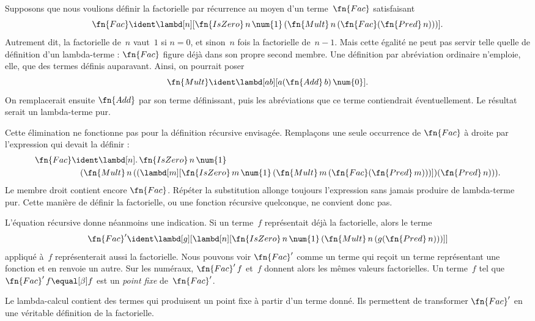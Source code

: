 \documentclass[../../../include/open-logic-section]{subfiles}
\begin{document}


Supposons que nous voulions définir la
factorielle par récurrence au moyen d'un
terme~$\fn{Fac}$ satisfaisant
\[
  \fn{Fac} \ident
  \lambd[n][\fn{IsZero}\,n\,\num{1}\,
    (\fn{Mult}\,n\,(
      \fn{Fac}(\fn{Pred}\,n)))].
\]
Autrement dit, la factorielle de~$n$
vaut~$1$ si $n=0$, et sinon~$n$ fois
la factorielle de~$n-1$. Mais cette
égalité ne peut pas servir telle quelle
de définition d'un lambda-terme :
$\fn{Fac}$ figure déjà dans son propre
second membre. Une définition par
abréviation ordinaire n'emploie, elle,
que des termes définis auparavant.
Ainsi, on pourrait poser
\[
  \fn{Mult} \ident
  \lambd[ab][a(\fn{Add}\,b)\,\num{0}].
\]
On remplacerait ensuite $\fn{Add}$
par son terme définissant, puis les
abréviations que ce terme contiendrait
éventuellement. Le résultat serait
un lambda-terme pur.

Cette élimination ne fonctionne pas
pour la définition récursive envisagée.
Remplaçons une seule occurrence de
$\fn{Fac}$ à droite par l'expression
qui devait la définir :
\begin{align*}
  \fn{Fac} &\ident
    \lambd[n].\,\fn{IsZero}\,n\,\num{1}\\
    &\quad(\fn{Mult}\,n\,
        ((\lambd[m][\fn{IsZero}\,m\,\num{1}\,
          (\fn{Mult}\,m\,
            (\fn{Fac}(\fn{Pred}\,m)))])
          (\fn{Pred}\,n))).
\end{align*}
Le membre droit contient encore
$\fn{Fac}$. Répéter la substitution
allonge toujours l'expression sans
jamais produire de lambda-terme pur.
Cette manière de définir la factorielle,
ou une fonction récursive quelconque,
ne convient donc pas.

L'équation récursive donne néanmoins
une indication. Si un terme~$f$
représentait déjà la factorielle,
alors le terme
\[
  \fn{Fac}' \ident
  \lambd[g][\lambd[n][
    \fn{IsZero}\,n\,\num{1}\,
      (\fn{Mult}\,n\,(g(\fn{Pred}\,n)))]]
\]
appliqué à~$f$ représenterait aussi
la factorielle. Nous pouvons voir
$\fn{Fac}'$ comme un terme qui reçoit
un terme représentant une fonction et
en renvoie un autre. Sur les numéraux,
$\fn{Fac}'\,f$ et~$f$ donnent alors
les mêmes valeurs factorielles. Un
terme~$f$ tel que $\fn{Fac}'\,f\equal[\beta]f$ est
un \emph{point fixe} de~$\fn{Fac}'$.

Le lambda-calcul contient des termes
qui produisent un point fixe à partir
d'un terme donné. Ils permettent de
transformer $\fn{Fac}'$ en une véritable
définition de la factorielle.
\end{document}
